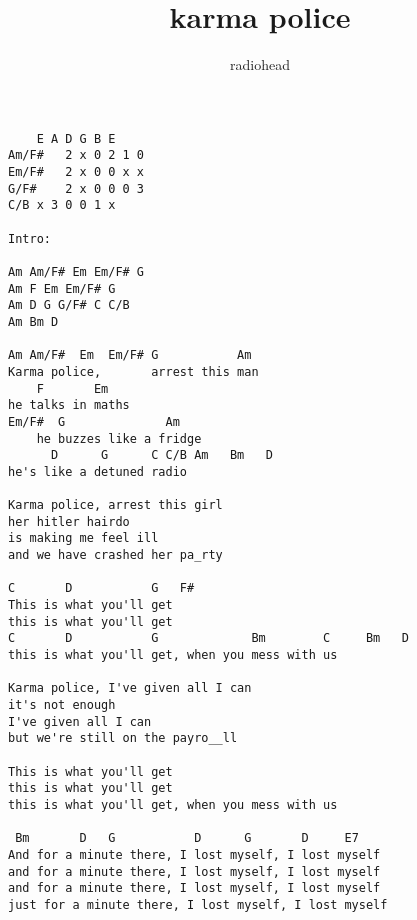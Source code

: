 \author{radiohead}
\title{karma police}
\maketitle
\begin{verbatim}
	E A D G B E
Am/F#   2 x 0 2 1 0
Em/F#	2 x 0 0 x x
G/F#	2 x 0 0 0 3
C/B	x 3 0 0 1 x

Intro:

Am Am/F# Em Em/F# G
Am F Em Em/F# G
Am D G G/F# C C/B
Am Bm D

Am Am/F#  Em  Em/F# G           Am
Karma police,       arrest this man
    F       Em
he talks in maths
Em/F#  G              Am
    he buzzes like a fridge 
      D      G      C C/B Am   Bm   D
he's like a detuned radio

Karma police, arrest this girl
her hitler hairdo
is making me feel ill
and we have crashed her pa_rty

C       D           G   F#
This is what you'll get
this is what you'll get
C       D           G             Bm        C     Bm   D
this is what you'll get, when you mess with us

Karma police, I've given all I can
it's not enough
I've given all I can 
but we're still on the payro__ll

This is what you'll get
this is what you'll get
this is what you'll get, when you mess with us 

 Bm       D   G           D      G       D     E7
And for a minute there, I lost myself, I lost myself
and for a minute there, I lost myself, I lost myself
and for a minute there, I lost myself, I lost myself
just for a minute there, I lost myself, I lost myself
\end{verbatim}
